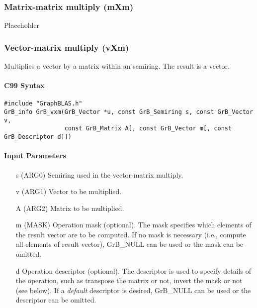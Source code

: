 \subsubsection{Matrix-matrix multiply ({\sf mXm})}

Placeholder



\subsubsection{Vector-matrix multiply ({\sf vXm})}

Multiplies a vector by a matrix within an semiring. The result is a vector.

\paragraph{C99 Syntax}

\begin{verbatim}
#include "GraphBLAS.h"
GrB_info GrB_vxm(GrB_Vector *u, const GrB_Semiring s, const GrB_Vector v, 
                 const GrB_Matrix A[, const GrB_Vector m[, const GrB_Descriptor d]])
\end{verbatim}


\paragraph{Input Parameters}

\begin{itemize}
	\item[{\sf s}] ({\sf ARG0}) Semiring used in the vector-matrix
	multiply.

	\item[{\sf v}] ({\sf ARG1}) Vector to be multiplied.

	\item[{\sf A}] ({\sf ARG2}) Matrix to be multiplied.

	\item[{\sf m}] ({\sf MASK}) Operation mask (optional). The mask
	specifies which elements of the result vector are to be computed.
	If no mask is necessary (i.e., compute all elements of result
	vector), {\sf GrB\_NULL} can be used or the mask can be omitted.

	\item[{\sf d}] Operation descriptor (optional). The descriptor
	is used to specify details of the operation, such as transpose
	the matrix or not, invert the mask or not (see below). If a
	\emph{default} descriptor is desired, {\sf GrB\_NULL} can be
	used or the descriptor can be omitted.
\end{itemize}

